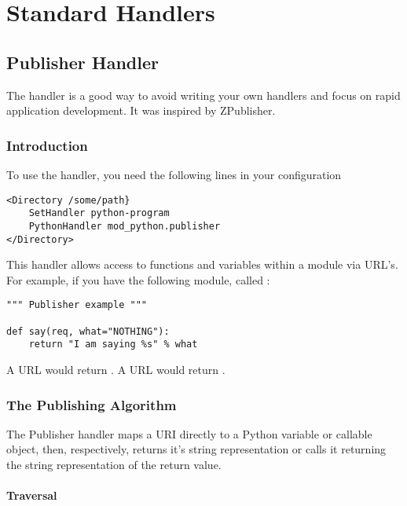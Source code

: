\chapter{Standard Handlers\label{handlers}}

\section{Publisher Handler\label{hand-pub}}

The  handler is a good way to avoid writing your own
handlers and focus on rapid application development. It was inspired
by  ZPublisher.

\subsection{Introduction\label{hand-pub-intro}}

To use the handler, you need the following lines in your configuration
\begin{verbatim}
<Directory /some/path}
    SetHandler python-program 
    PythonHandler mod_python.publisher
</Directory>
\end{verbatim}

This handler allows access to functions and variables within a module
via URL's. For example, if you have the following module, called 
:

\begin{verbatim}
""" Publisher example """

def say(req, what="NOTHING"):
    return "I am saying %s" % what

\end{verbatim}

A URL  would return 
. A URL 
 would
return .

\subsection{The Publishing Algorithm\label{hand-pub-alg}}

The Publisher handler maps a URI directly to a Python variable or
callable object, then, respectively, returns it's string
representation or calls it returning the string representation of the
return value.

\subsubsection{Traversal\label{hand-pub-alg-trav}}

